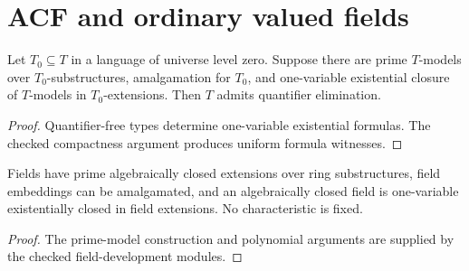 \section{ACF and ordinary valued fields}

\begin{theorem}

\label{johnson}


\leanok

Let $T_0\subseteq T$ in a language of universe level zero. Suppose there are
prime $T$-models over $T_0$-substructures, amalgamation for $T_0$, and
one-variable existential closure of $T$-models in $T_0$-extensions.
Then $T$ admits quantifier elimination.

\end{theorem}

\begin{proof}


\leanok

Quantifier-free types determine one-variable existential formulas.
The checked compactness argument produces uniform formula witnesses.

\end{proof}

\begin{lemma}

\label{acf-inputs}


\leanok

Fields have prime algebraically closed extensions over ring substructures,
field embeddings can be amalgamated, and an algebraically closed field is
one-variable existentially closed in field extensions. No characteristic is fixed.

\end{lemma}

\begin{proof}

\leanok

The prime-model construction and polynomial arguments are supplied by the
checked field-development modules.

\end{proof}

